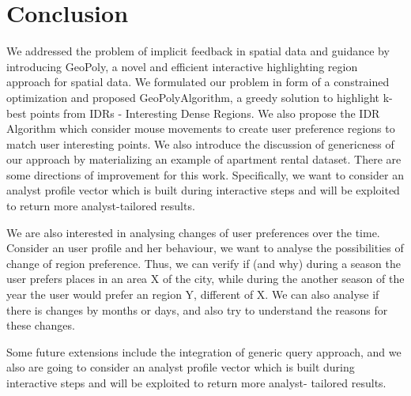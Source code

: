 \documentclass{vldb}
\newcommand{\sgg}{{\sc GeoPoly}}
\begin{document}
\section{Conclusion}
\label{sec:conclusions}
We addressed the problem of implicit feedback in spatial data and guidance by introducing \sgg , a novel and efficient interactive highlighting region approach for spatial data. We formulated our problem in form of a constrained optimization and proposed \sgg Algorithm, a greedy solution to highlight k-best points from IDRs - Interesting Dense Regions. We also propose the IDR Algorithm which consider mouse movements to create user preference regions to match user interesting points. We also introduce the discussion of genericness of our approach by materializing an example of apartment rental dataset. There are some directions of improvement for this work. Specifically, we want to consider an analyst profile vector which is built during interactive steps and will be exploited to return more analyst-tailored results.

We are also interested in analysing changes of user preferences over the time. Consider an user profile and her behaviour, we want to analyse the possibilities of change of region preference. Thus, we can verify if (and why) during a season the user prefers places in an area X of the city, while during the another season of the year the user would prefer an region Y, different of X. We can also analyse if there is changes by months or days, and also try to understand the reasons for these changes.

Some future extensions include the integration of generic query approach, and we also are going to consider an analyst profile vector which is built during interactive steps and will be exploited to return more analyst- tailored results.
\bigskip


\end{document}
